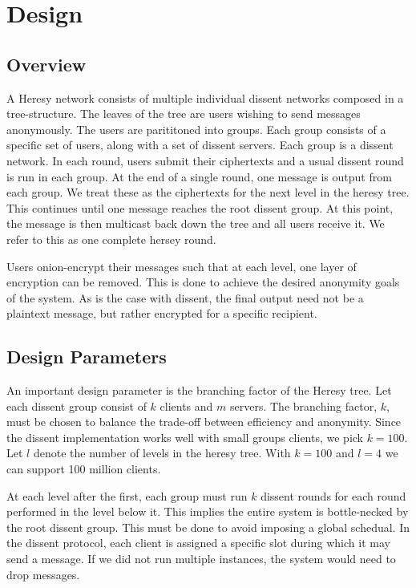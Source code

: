 \section{Design}
\subsection{Overview}
A Heresy network consists of multiple individual dissent networks composed in a tree-structure. The leaves of the tree are users wishing to send messages anonymously. The users are parititoned into groups. Each group consists of a specific set of users, along with a set of dissent servers. Each group is a dissent network. In each round, users submit their ciphertexts and a usual dissent round is run in each group. At the end of a single round, one message is output from each group. We treat these as the ciphertexts for the next level in the heresy tree. This continues until one message reaches the root dissent group. At this point, the message is then multicast back down the tree and all users receive it. We refer to this as one complete hersey round.

Users onion-encrypt their messages such that at each level, one layer of encryption can be removed. This is done to achieve the desired anonymity goals of the system. As is the case with dissent, the final output need not be a plaintext message, but rather encrypted for a specific recipient.

\subsection{Design Parameters}

An important design parameter is the branching factor of the Heresy tree. Let each dissent group consist of $k$ clients and $m$ servers. The branching factor, $k$, must be chosen to balance the trade-off between efficiency and anonymity. Since the dissent implementation works well with small groups clients, we pick $k=100$. Let $l$ denote the number of levels in the heresy tree. With $k=100$ and $l=4$ we can support 100 million clients.

At each level after the first, each group must run $k$ dissent rounds for each round performed in the level below it. This implies the entire system is bottle-necked by the root dissent group. This must be done to avoid imposing a global schedual. In the dissent protocol, each client is assigned a specific slot during which it may send a message. If we did not run multiple instances, the system would need to drop messages. 

